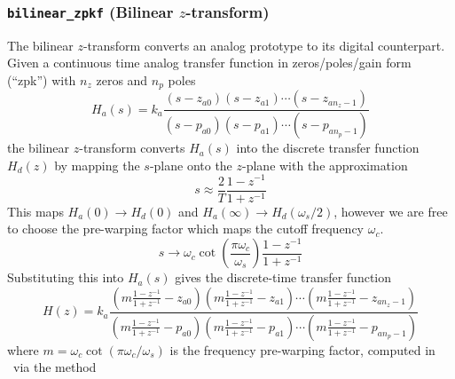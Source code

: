 \subsubsection{{\tt bilinear\_zpkf} (Bilinear $z$-transform)}
\label{module:filter:iirdes:bilinear}
The bilinear $z$-transform converts an analog prototype to its digital
counterpart.
Given a continuous time analog transfer function in zeros/poles/gain
form (``zpk'') with $n_z$ zeros and $n_p$ poles
%
\begin{equation}
\label{eqn:filter:iirdes:Ha}
    H_a(s) = k_a
            \frac{
                (s-z_{a0})(s-z_{a1})\cdots(s-z_{an_z-1})
            }{
                (s-p_{a0})(s-p_{a1})\cdots(s-p_{an_p-1})
            }
\end{equation}
%
the bilinear $z$-transform converts $H_a(s)$ into the discrete transfer
function $H_d(z)$ by mapping the $s$-plane onto the $z$-plane with the
approximation
%
\begin{equation}
\label{eqn:filter:iirdes:bilinear}
    s \approx \frac{2}{T}
              \frac{1-z^{-1}}{1 + z^{-1}}
\end{equation}
%
This maps $H_a(0) \rightarrow H_d(0)$ and
$H_a(\infty) \rightarrow H_d(\omega_s/2)$, however we are free to choose
the pre-warping factor which maps the cutoff frequency $\omega_c$.
%
\begin{equation}
\label{eqn:filter:iirdes:bilinear_prewarp}
    s \rightarrow \omega_c
                  \cot\left(\frac{\pi \omega_c}{\omega_s}\right)
                  \frac{1-z^{-1}}{1+z^{-1}}
\end{equation}
%
Substituting this into $H_a(s)$ gives the discrete-time transfer
function
%
\begin{equation}
\label{eqn:filter:iirdes:H}
    H(z) = k_a \frac{
            \left(m\frac{1-z^{-1}}{1+z^{-1}}-z_{a0}\right)
            \left(m\frac{1-z^{-1}}{1+z^{-1}}-z_{a1}\right)
            \cdots
            \left(m\frac{1-z^{-1}}{1+z^{-1}}-z_{an_z-1}\right)
           }{
            \left(m\frac{1-z^{-1}}{1+z^{-1}}-p_{a0}\right)
            \left(m\frac{1-z^{-1}}{1+z^{-1}}-p_{a1}\right)
            \cdots
            \left(m\frac{1-z^{-1}}{1+z^{-1}}-p_{an_p-1}\right)
           }
\end{equation}
%
where $m=\omega_c \cot\left(\pi \omega_c / \omega_s\right)$ is the
frequency pre-warping factor, computed in \liquid\ via the method
